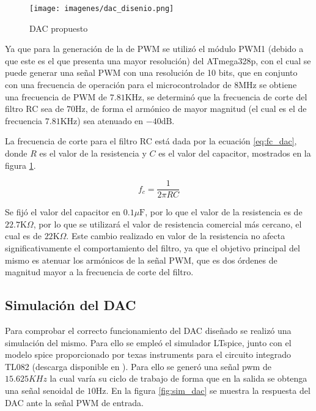     \begin{figure}[H]
        \centering
        \texttt{[image: imagenes/dac\_disenio.png]}
        \caption{DAC propuesto}
        \label{fig:dac}
    \end{figure}

    Ya que para la generación de la de PWM se utilizó el módulo PWM1 (debido
    a que este es el que presenta una mayor resolución) del ATmega328p, con el 
    cual se puede generar una señal PWM con una resolución de 10 bits, que en
    conjunto con una frecuencia de operación para el microcontrolador de $8\text{MHz}$
    se obtiene una frecuencia de PWM de $7.81\text{KHz}$, se determinó que la 
    frecuencia de corte del filtro RC sea de $70\text{Hz}$, de forma el armónico
    de mayor magnitud (el cual es el de frecuencia $7.81\text{KHz}$) sea atenuado
    en $-40\text{dB}$. 

    La frecuencia de corte para el filtro RC está dada por la ecuación \ref{eq:fc_dac},
    donde $R$ es el valor de la resistencia y $C$ es el valor del capacitor, mostrados
    en la figura \ref{fig:dac}.

    \begin{equation}
        f_c = \frac{1}{2\pi RC}
        \label{eq:fc_dac}
    \end{equation}

    Se fijó el valor del capacitor en $0.1\mu\text{F}$, por lo que el valor de la
    resistencia es de $22.7\text{K}\Omega$, por lo que se utilizará el valor 
    de resistencia comercial más cercano, el cual es de $22\text{K}\Omega$.
    Este cambio realizado en valor de la resistencia no afecta
    significativamente el comportamiento del filtro, ya que el objetivo 
    principal del mismo es atenuar los armónicos de la señal PWM, que es 
    dos órdenes de magnitud mayor a la frecuencia de corte del filtro.

    \subsection{Simulación del DAC}

    Para comprobar el correcto funcionamiento del DAC diseñado se realizó una
    simulación del mismo. Para ello se empleó el simulador LTspice, junto con
    el modelo spice proporcionado por texas instruments para el circuito integrado
    TL082 (descarga disponible en \cite{noauthor_tl082_nodate}). Para ello se 
    generó una señal pwm de $15.625KHz$ la cual varía su ciclo de trabajo 
    de forma que en la salida se obtenga una señal senoidal de $10\text{Hz}$. 
    En la figura
    \ref{fig:sim_dac} se muestra la respuesta del DAC ante la señal PWM de entrada.

